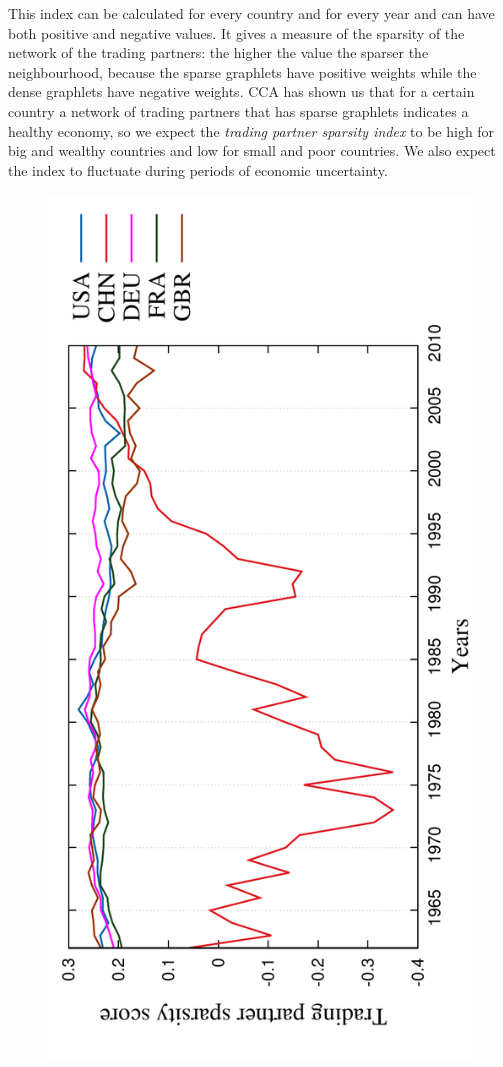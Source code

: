 This index can be calculated for every country and for every year and can have both positive and negative values. It gives a measure of the sparsity of the network of the trading partners: the higher the value the sparser the neighbourhood, because the sparse graphlets have positive weights while the dense graphlets have negative weights. CCA has shown us that for a certain country a network of trading partners that 
has sparse graphlets indicates a healthy economy, so we expect the \emph{trading partner sparsity index} to be high for big and wealthy countries and low for small and poor countries. We also expect the index to fluctuate during periods of economic uncertainty.

\begin{figure}[H]
  \centering
\includegraphics[angle=-90,scale=0.6]{../code/extra_results/trading_partner_density/scores/g72.pdf}

\end{figure}
